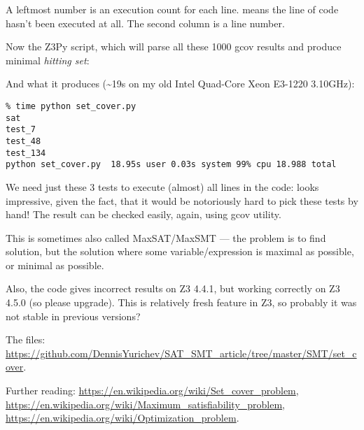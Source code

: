 A leftmost number is an execution count for each line.
\TT{\#\#\#\#\#} means the line of code hasn't been executed at all.
The second column is a line number.

Now the Z3Py script, which will parse all these 1000 gcov results and produce minimal \textit{hitting set}:



And what it produces (\textasciitilde{}19s on my old Intel Quad-Core Xeon E3-1220 3.10GHz):

\begin{lstlisting}
% time python set_cover.py
sat
test_7
test_48
test_134
python set_cover.py  18.95s user 0.03s system 99% cpu 18.988 total
\end{lstlisting}

We need just these 3 tests to execute (almost) all lines in the code:
looks impressive, given the fact, that it would be notoriously hard to pick these tests by hand!
The result can be checked easily, again, using gcov utility.

This is sometimes also called MaxSAT/MaxSMT --- the problem is to find solution,
but the solution where some variable/expression is maximal as possible, or minimal as possible.

Also, the code gives incorrect results on Z3 4.4.1, but working correctly on Z3 4.5.0 (so please upgrade).
This is relatively fresh feature in Z3, so probably it was not stable in previous versions?

The files: \url{https://github.com/DennisYurichev/SAT_SMT_article/tree/master/SMT/set_cover}.

Further reading:
\url{https://en.wikipedia.org/wiki/Set_cover_problem},
\url{https://en.wikipedia.org/wiki/Maximum_satisfiability_problem},
\url{https://en.wikipedia.org/wiki/Optimization_problem}.

